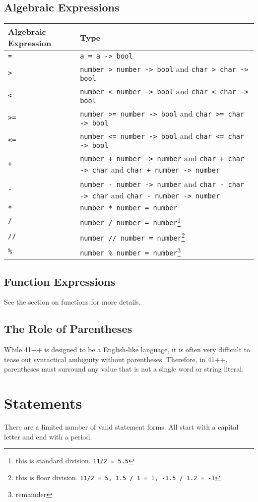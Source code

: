 \documentclass{article}
\newcommand{\code}[1]{\texttt{#1}}
\begin{document}
\subsection{Algebraic Expressions}
\begin{tabular}{|l|p{10cm}|}
\hline
Algebraic Expression & Type\\
\hline
\code{=} & \code{a = a -> bool}\\
\hline
\code{>} & \code{number > number -> bool} and \code{char > char -> bool}\\
\hline
\code{<} & \code{number < number -> bool} and \code{char < char -> bool}\\
\hline
\code{>=}& \code{number >= number -> bool} and \code{char >= char -> bool}\\
\hline
\code{<=} & \code{number <= number -> bool} and \code{char <= char -> bool}\\
\hline
\code{+}& \code{number + number -> number} and \code{char + char -> char} and \code{char + number -> number}\\
\hline
\code{-} & \code{number - number -> number} and \code{char - char -> char} and \code{char - number -> number}\\
\hline
\code{*} & \code{number * number = number}\\
\hline
\code{/} & \code{number / number = number}\footnote{this is standard division. \code{11/2 = 5.5}}\\
\hline
\code{//} & \code{number // number = number}\footnote{this is floor division. \code{11/2 = 5, 1.5 / 1 = 1, -1.5 / 1.2 = -1}}\\
\hline
\code{\%} & \code{number \% number = number}\footnote{remainder}\\
\hline
\end{tabular}
\subsection{Function Expressions}
See the section on functions for more details.
\subsection{The Role of Parentheses}
While 41++ is designed to be a English-like language, it is often very difficult to tease out syntactical ambiguity without parentheses. Therefore, in 41++, parentheses must surround any value that is not a single word or string literal.
\section{Statements}
There are a limited number of valid statement forms. All start with a capital letter and end with a period.
\end{document}
